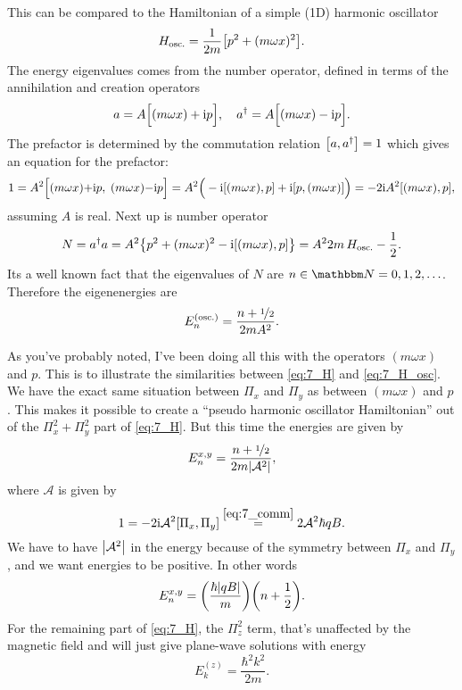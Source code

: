 \documentclass[11pt,letter, swedish, english
]{article}
\begin{document}
This can be compared to the Hamiltonian of a simple (1D) harmonic
oscillator 
\begin{equation}\label{eq:7_H_osc}
H_\text{osc.}=\frac{1}{2m}\qty[p^2+(m\omega x)^2].
\end{equation}
The energy eigenvalues comes from the number operator, defined in
terms of the annihilation and creation operators
\begin{equation}
a=A\Big[(m\omega x) +\ii p\Big]\qcomma
a^\dagger=A\Big[(m\omega x) -\ii p\Big].
\end{equation}
The prefactor is determined by the commutation
relation $\comm{a}{a^\dagger}=1$ which gives an equation for the prefactor:
\begin{equation}
1={A}^2\comm{(m\omega x){+}\ii p\Big.}{\;(m\omega x){-}\ii p}
={A}^2
\Big(-\ii\comm{(m\omega x)}{p} +\ii\comm{p}{(m\omega x)}\Big)
=-2\ii{A}^2\comm{(m\omega x)}{p},
\end{equation}
assuming $A$ is real. Next up is number operator
\begin{equation}
N=a^\dagger a = A^2\qty{p^2+(m\omega x)^2 
-\ii\comm{(m\omega x)}{p}}
=A^22m\,H_\text{osc.}-\frac{1}{2}.
\end{equation}
Its a well known fact that the eigenvalues of $N$ are 
$n\in\N={0, 1, 2,\ldots}$. Therefore the eigenenergies are
\begin{equation}
E_n^{(\text{osc.})}=\frac{n+\nicefrac{1}{2}}{2mA^2}.
\end{equation}

As you've probably noted, I've been doing all this with the operators
$(m\omega x)$ and $p$. This is to illustrate the similarities between
\eqref{eq:7_H} and \eqref{eq:7_H_osc}. We have the exact same
situation between $\Pi_x$ and $\Pi_y$ as between $(m\omega x)$ and
$p$. This makes it possible to create a ``pseudo harmonic oscillator
Hamiltonian'' out of the $\Pi_x^2+\Pi_y^2$ part of \eqref{eq:7_H}. But
this time the energies  are given by
\begin{equation}
E_n^{x,y}=\frac{n+\nicefrac{1}{2}}{2m\abs{\mathcal{A}^2}},
\end{equation}
where $\mathcal{A}$ is given by
\begin{equation}
1=-2\ii\mathcal{A}^2\comm{\Pi_x}{\Pi_y}
\stackrel{\eqref{eq:7_comm}}{=}2\mathcal{A}^2\hbar qB.
\end{equation}
We have to have $\abs{\mathcal{A}^2}$ in the energy because of the
symmetry\footnotemark{} between $\Pi_x$ and $\Pi_y$, and we want
energies to be positive. In other words
\begin{equation}
E_n^{x,y}=\qty(\frac{\hbar\abs{qB}}{m})\qty(n+\frac{1}{2}).
\end{equation}
For the remaining part of \eqref{eq:7_H}, the $\Pi_z^2$ term, that's
unaffected by the magnetic field and will just give plane-wave
solutions with energy
\begin{equation}
E^{(z)}_k=\frac{\hbar^2k^2}{2m}.
\end{equation}
\end{document}
